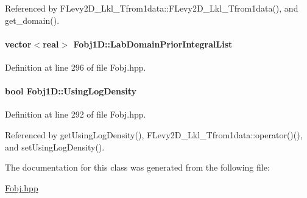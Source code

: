 \-Referenced by \-F\-Levy2\-D\-\_\-\-Lkl\-\_\-\-Tfrom1data\-::\-F\-Levy2\-D\-\_\-\-Lkl\-\_\-\-Tfrom1data(), and get\-\_\-domain().

\hypertarget{classFobj1D_a37fff89dd0ffdea65e7dad2b148eb629}{
\paragraph[{\-Lab\-Domain\-Prior\-Integral\-List}]{\setlength{\rightskip}{0pt plus 5cm}vector$<$real$>$ {\bf \-Fobj1\-D\-::\-Lab\-Domain\-Prior\-Integral\-List}}}\label{classFobj1D_a37fff89dd0ffdea65e7dad2b148eb629}


\-Definition at line 296 of file \-Fobj.\-hpp.

\hypertarget{classFobj1D_a538b74d7dc5b9e3652c2a36950f25de9}{
\paragraph[{\-Using\-Log\-Density}]{\setlength{\rightskip}{0pt plus 5cm}bool {\bf \-Fobj1\-D\-::\-Using\-Log\-Density}}}\label{classFobj1D_a538b74d7dc5b9e3652c2a36950f25de9}


\-Definition at line 292 of file \-Fobj.\-hpp.



\-Referenced by get\-Using\-Log\-Density(), \-F\-Levy2\-D\-\_\-\-Lkl\-\_\-\-Tfrom1data\-::operator()(), and set\-Using\-Log\-Density().



\-The documentation for this class was generated from the following file\-:\begin{DoxyCompactItemize}
\item 
\hyperlink{Fobj_8hpp}{\-Fobj.\-hpp}\end{DoxyCompactItemize}
